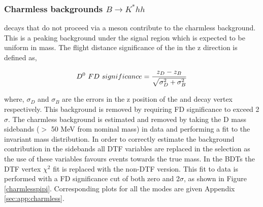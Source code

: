 \subsubsection{Charmless backgrounds $B \to K^*hh$}
\label{sec:backgrounds:charmless}

\B decays that do not proceed via a \D meson contribute to the charmless background. This is a peaking background under the signal region which is expected to be uniform in \D mass. The flight distance significance of the \Dz in the z direction is defined as,

\begin{equation}
{\ensuremath{{D}^0}}\ FD\ significance = \frac{z_D - z_B}{\sqrt{\sigma_D^2 + \sigma_B^2}}
\label{FDdefinition}
\end{equation}

where, $\sigma_D$ and $\sigma_B$ are the errors in the z position of the \D and \B decay vertex respectively. This background is removed by requiring \Dz FD significance to exceed 2$\sigma$. The charmless background is estimated and removed by taking the D mass sidebands ($>$ 50 MeV from nominal \D mass) in data and performing a fit to the invariant \B mass distribution. In order to correctly estimate the background contribution in the \D sidebands all DTF variables are replaced in the selection as the use of these variables favours events towards the true \D mass. In the BDTs the DTF vertex $\chi^2$ fit is replaced with the non-DTF version. This fit to data is performed with a FD significance cut of both zero and 2$\sigma$, as shown in Figure \ref{charmlesspipi}. Corresponding plots for all the modes are given Appendix \ref{sec:app:charmless}.

